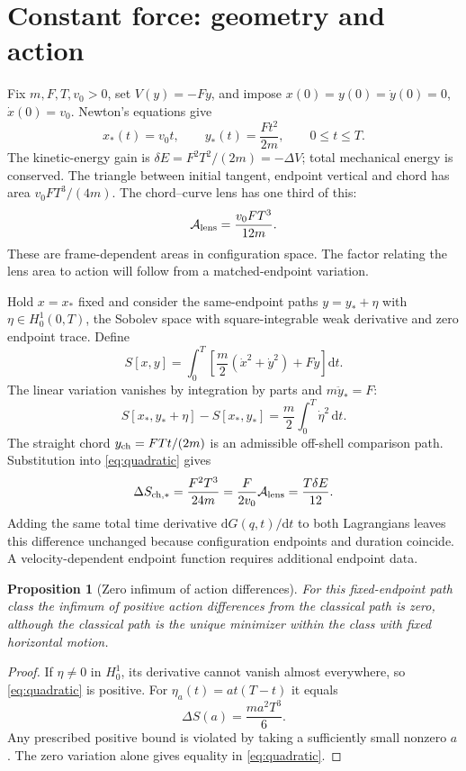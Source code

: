\documentclass[11pt,a4paper]{article}
\newtheorem{proposition}{Proposition}
\newcommand{\dd}{\mathrm{d}}
\begin{document}
\section{Constant force: geometry and action}
Fix $m,F,T,v_0>0$, set $V(y)=-Fy$, and impose
$x(0)=y(0)=\dot y(0)=0$, $\dot x(0)=v_0$. Newton's equations give
\[
 x_*(t)=v_0t,\qquad y_*(t)=\frac{F t^2}{2m},\qquad 0\le t\le T.
\]
The kinetic-energy gain is $\delta E=F^2T^2/(2m)=-\Delta V$; total mechanical
energy is conserved. The triangle between initial tangent, endpoint vertical
and chord has area $v_0FT^3/(4m)$. The chord--curve lens has one third of this:
\[
 \mathcal A_{\rm lens}=\frac{v_0FT^3}{12m}.
\]
These are frame-dependent areas in configuration space. The factor relating
the lens area to action will follow from a matched-endpoint variation.

Hold $x=x_*$ fixed and consider the same-endpoint paths $y=y_*+\eta$ with
$\eta\in H^1_0(0,T)$, the Sobolev space with square-integrable weak derivative
and zero endpoint trace. Define
\[
 S[x,y]=\int_0^T\left[\frac m2(\dot x^2+\dot y^2)+Fy\right]\dd t.
\]
The linear variation vanishes by integration by parts and $m\ddot y_*=F$:
\begin{equation}\label{eq:quadratic}
 S[x_*,y_*+\eta]-S[x_*,y_*]=\frac m2\int_0^T\dot\eta^2\,\dd t.
\end{equation}
The straight chord $y_{\rm ch}=FTt/(2m)$ is an admissible off-shell comparison
path. Substitution into \eqref{eq:quadratic} gives
\begin{equation}\label{eq:area}
 \Delta S_{\rm ch,*}=\frac{F^2T^3}{24m}
 =\frac{F}{2v_0}\mathcal A_{\rm lens}=\frac{T\delta E}{12}.
\end{equation}
Adding the same total time derivative $\dd G(q,t)/\dd t$ to both Lagrangians
leaves this difference unchanged because configuration endpoints and duration
coincide. A velocity-dependent endpoint function requires additional endpoint data.

\begin{proposition}[Zero infimum of action differences]\label{prop:no-gap}
For this fixed-endpoint path class the infimum of positive action differences
from the classical path is zero, although the classical path is the unique
minimizer within the class with fixed horizontal motion.
\end{proposition}
\begin{proof}
If $\eta\ne0$ in $H^1_0$, its derivative cannot vanish almost everywhere, so
\eqref{eq:quadratic} is positive. For $\eta_a(t)=a t(T-t)$ it equals
\[
 \Delta S(a)=\frac{m a^2T^3}{6}.
\]
Any prescribed positive bound is violated by taking a sufficiently small nonzero
$a$. The zero variation alone gives equality in \eqref{eq:quadratic}.
\end{proof}
\end{document}
